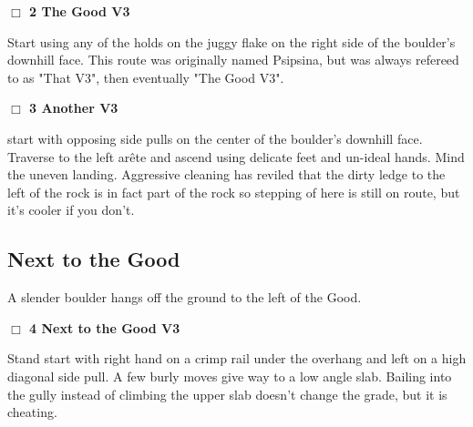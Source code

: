 	\begin{multicols}{2}

\needspace{2em}
\label{rt:The Good}
\colorbox{green!20}{
\parbox{0.95\linewidth}{
\hspace{-1ex}\textbf{$\Box$
2 The Good V3  
}}}
\begin{adjustwidth}{1.3em}{}			

Start using any of the holds on the juggy flake on the right side of the boulder's downhill face. This route was originally named Psipsina, but was always refereed to as "That V3", then eventually "The Good V3".
\end{adjustwidth}




\needspace{2em}
\label{rt:Another}
\colorbox{green!20}{
\parbox{0.95\linewidth}{
\hspace{-1ex}\textbf{$\Box$
3 Another V3  \warn
}}}
\begin{adjustwidth}{1.3em}{}			

start with opposing side pulls on the center of the boulder's downhill face. Traverse to the left arête and ascend using delicate feet and un-ideal hands. Mind the uneven landing. Aggressive cleaning has reviled that the dirty ledge to the left of the rock is in fact part of the rock so stepping of here is still on route, but it's cooler if you don't.
\end{adjustwidth}





\needspace{10em}
\subsection*{Next to the Good}\label{bf:Next to the Good}

A slender boulder hangs off the ground to the left of the Good.\\



\needspace{2em}
\label{rt:Next to the Good}
\colorbox{green!20}{
\parbox{0.95\linewidth}{
\hspace{-1ex}\textbf{$\Box$
4 Next to the Good V3  \warn
}}}
\begin{adjustwidth}{1.3em}{}			

Stand start with right hand on a crimp rail under the overhang and left on a high diagonal side pull. A few burly moves give way to a low angle slab. Bailing into the gully instead of climbing the upper slab doesn't change the grade, but it is cheating.
\end{adjustwidth}





\end{multicols}
